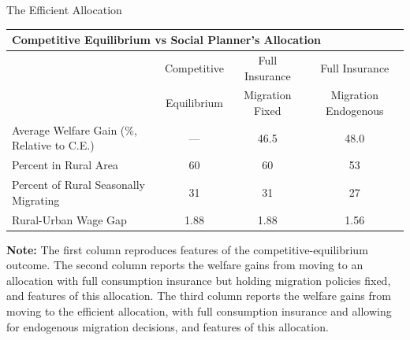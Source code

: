 \documentclass[9pt,pdftex,aspectratio=1610]{beamer}
\theoremstyle{definition}
\begin{document}
\begin{frame}[t]{The Efficient Allocation}
\begin{table}[!t]
\small
\setlength {\tabcolsep}{2.055mm}
\renewcommand{\arraystretch}{1.40}
\begin{center}
\begin{tabular}{l c c c}
\multicolumn{4}{l}{\textbf{Competitive Equilibrium vs Social Planner's Allocation}} \\
\hline
\hline
						& Competitive & Full Insurance & Full Insurance  \\
						& Equilibrium & Migration Fixed & Migration Endogenous \\
						\cmidrule(lr){2-2} \cmidrule(lr){3-3}     \cmidrule(lr){4-4}
Average Welfare Gain  (\%, Relative to C.E.)      & ---   			& 46.5 			& 48.0  \\
Percent in Rural Area				   & 60 			& 60				&  53 \\
Percent of Rural Seasonally Migrating		   & 31 			& 31				&  27 \\
Rural-Urban Wage Gap				   & 1.88 			& 1.88				&  1.56 \\
\hline
\hline
\end{tabular}
\parbox[c]{5.2in}{%
{\footnotesize  \vspace{0.1cm} \textbf{Note:} The first column reproduces features of the competitive-equilibrium outcome. The second column reports the welfare gains from moving to an allocation with full consumption insurance but holding migration policies fixed, and features of this allocation. The third column reports the welfare gains from moving to the efficient allocation, with full consumption insurance and allowing for endogenous migration decisions, and features of this allocation.}
}
\end{center}
\end{table}
\end{frame}

\end{document}
